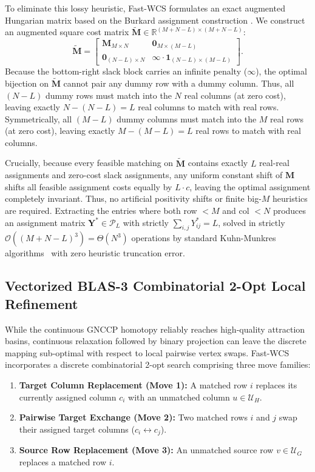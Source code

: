 \documentclass[conference]{IEEEtran}
\begin{document}
To eliminate this lossy heuristic, Fast-WCS formulates an exact augmented Hungarian matrix based on the Burkard assignment construction \cite{loiola2007, burkard2009assignment}. We construct an augmented square cost matrix $\tilde{\mathbf{M}} \in \mathbb{R}^{(M+N-L) \times (M+N-L)}$:
\begin{equation}
\tilde{\mathbf{M}} = \begin{bmatrix}
\mathbf{M}_{M \times N} & \mathbf{0}_{M \times (M - L)} \\
\mathbf{0}_{(N - L) \times N} & \infty \cdot \mathbf{1}_{(N - L) \times (M - L)}
\end{bmatrix}.
\label{eq:augmented_hungarian}
\end{equation}
Because the bottom-right slack block carries an infinite penalty ($\infty$), the optimal bijection on $\tilde{\mathbf{M}}$ cannot pair any dummy row with a dummy column. Thus, all $(N - L)$ dummy rows must match into the $N$ real columns (at zero cost), leaving exactly $N - (N - L) = L$ real columns to match with real rows. Symmetrically, all $(M - L)$ dummy columns must match into the $M$ real rows (at zero cost), leaving exactly $M - (M - L) = L$ real rows to match with real columns.

Crucially, because every feasible matching on $\tilde{\mathbf{M}}$ contains exactly $L$ real-real assignments and zero-cost slack assignments, any uniform constant shift of $\mathbf{M}$ shifts all feasible assignment costs equally by $L \cdot c$, leaving the optimal assignment completely invariant. Thus, no artificial positivity shifts or finite big-$M$ heuristics are required. Extracting the entries where both row $< M$ and col $< N$ produces an assignment matrix $\mathbf{Y}^* \in \mathcal{P}_L$ with strictly $\sum_{i, j} Y^*_{ij} = L$, solved in strictly $\mathcal{O}((M + N - L)^3) = \Theta(N^3)$ operations by standard Kuhn-Munkres algorithms~\cite{kuhn1955hungarian} with zero heuristic truncation error.

\subsection{Vectorized BLAS-3 Combinatorial 2-Opt Local Refinement}
\label{subsec:2opt}

While the continuous GNCCP homotopy reliably reaches high-quality attraction basins, continuous relaxation followed by binary projection can leave the discrete mapping sub-optimal with respect to local pairwise vertex swaps. Fast-WCS incorporates a discrete combinatorial 2-opt search comprising three move families:
\begin{enumerate}
    \item \textbf{Target Column Replacement (Move 1):} A matched row $i$ replaces its currently assigned column $c_i$ with an unmatched column $u \in \mathcal{U}_H$.
    \item \textbf{Pairwise Target Exchange (Move 2):} Two matched rows $i$ and $j$ swap their assigned target columns ($c_i \leftrightarrow c_j$).
    \item \textbf{Source Row Replacement (Move 3):} An unmatched source row $v \in \mathcal{U}_G$ replaces a matched row $i$.
\end{enumerate}
\end{document}
